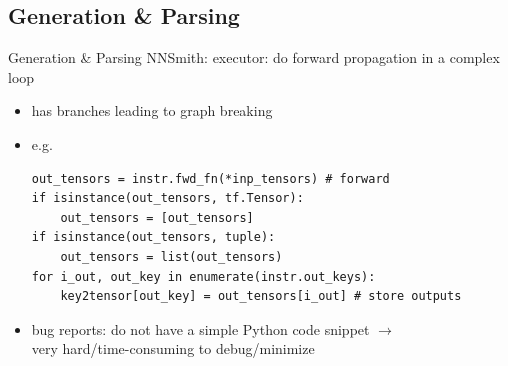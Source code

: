 \documentclass{beamer}
\begin{document}
\subsection{Generation \& Parsing}
\begin{frame}[fragile]{Generation \& Parsing}
    NNSmith: executor: do forward propagation in a complex loop
    \begin{itemize}
        \item has branches leading to graph breaking
        \item e.g. \begin{verbatim}
out_tensors = instr.fwd_fn(*inp_tensors) # forward
if isinstance(out_tensors, tf.Tensor):
    out_tensors = [out_tensors]
if isinstance(out_tensors, tuple):
    out_tensors = list(out_tensors)
for i_out, out_key in enumerate(instr.out_keys):
    key2tensor[out_key] = out_tensors[i_out] # store outputs
        \end{verbatim}
        \item bug reports: do not have a simple Python code snippet $\rightarrow$\\
        very hard/time-consuming to debug/minimize
    \end{itemize}
\end{frame}
\end{document}
